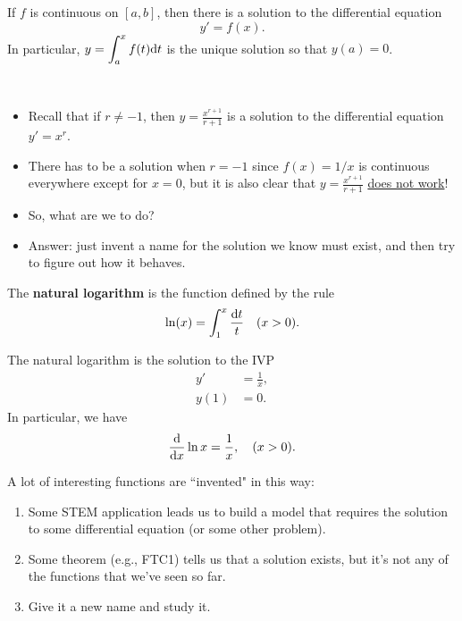 

\begin{theorem}
If $f$ is continuous on $[a,b]$, then there is a solution to the differential equation
\begin{equation*}
y'=f(x).
\end{equation*}
In particular, $y=\displaystyle\int_a^xf(t)\mathrm{d} t$ is the unique solution so that $y(a)=0$.
\end{theorem}

\begin{remark}\,
\begin{itemize}
\item Recall that if $r\ne -1$, then $y= \frac{x^{r+1}}{r+1}$ is a solution to the differential equation $y'=x^r$.
\item There has to be a solution when $r=-1$ since $f(x)=1/x$ is continuous everywhere except for $x=0$, but it is also clear that $y=\frac{x^{r+1}}{r+1}$ \underline{does not work}!
\item So, what are we to do?
\item Answer: just invent a name for the solution we know must exist, and then try to figure out how it behaves.
\end{itemize}
\end{remark}

\begin{definition}
The \textbf{natural logarithm} is the function defined by the rule
\begin{equation*}
\ln(x) = \int_1^x\frac{\mathrm{d} t}{t}\quad (x>0).
\end{equation*}
\end{definition}

\begin{corollary}
The natural logarithm is the solution to the IVP
\begin{align*}
y' & = \frac{1}{x},\\
y(1) &=0.
\end{align*}
In particular, we have
\begin{equation*}
\frac{\mathrm{d}}{\mathrm{d} x}\ln x = \frac{1}{x},\quad (x>0).
\end{equation*}
\end{corollary}

\begin{remark}
A lot of interesting functions are ``invented" in this way:
\begin{enumerate}
\item Some STEM application leads us to build a model that requires the solution to some differential equation (or some other problem).
\item Some theorem (e.g., FTC1) tells us that a solution exists, but it's not any of the functions that we've seen so far.
\item Give it a new name and study it.
\end{enumerate}
\end{remark}

